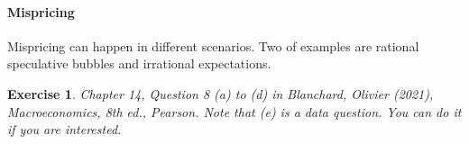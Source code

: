 \documentclass[12pt]{article}
\newtheorem{exercise}{Exercise}
\begin{document}
\paragraph{Mispricing} Mispricing can happen in different scenarios. Two of examples are rational speculative bubbles and irrational expectations.

\begin{exercise}
    Chapter 14, Question 8 (a) to (d) in Blanchard, Olivier (2021), \textit{Macroeconomics}, 8th ed., Pearson. Note that (e) is a data question. You can do it if you are interested.
\end{exercise}
\end{document}

